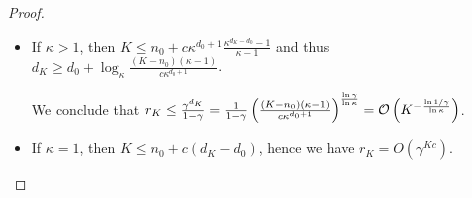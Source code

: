\begin{subappendices}
\begin{proof}
		\begin{itemize}
			\item If $\kappa > 1$, then $K \leq n_0 + c\kappa^{d_0+1}\frac{\kappa^{d_K-d_0}-1}{\kappa-1}$ and thus $d_K \geq d_0 + \log_\kappa \frac{(K-n_0)(\kappa - 1)}{c\kappa^{d_0+1}}$.
			
			We conclude that $r_K \leq \frac{\gamma^{d_K}}{1-\gamma} = \frac{1}{1-\gamma} \left( \frac{(K-n_0)(\kappa - 1)}{c\kappa^{d_0+1}} \right)^\frac{\ln \gamma}{\ln \kappa} = \mathcal{O}\left(K^{-\frac{\ln 1/\gamma}{\ln \kappa}}\right)$.
			
			\item If $\kappa = 1$, then $K \leq n_0 + c(d_K-d_0)$, hence we have $r_K = O\left(\gamma^{Kc}\right)$.
		\end{itemize}
	\end{proof}
	

\end{subappendices}
